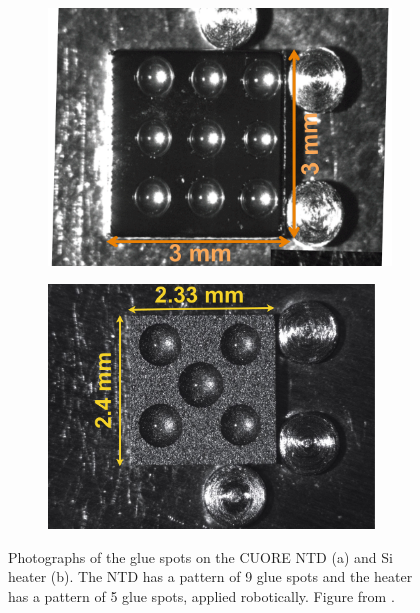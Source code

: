 \begin{figure}[htbp]
\centering
\begin{subfigure}[t]{0.45\textwidth}
\centering
    \includegraphics[width=0.95\linewidth]{Figures/fig10a.pdf}
\caption{}
\label{fig:glue_NTD}
\end{subfigure}
\qquad
\begin{subfigure}[t]{0.45\textwidth}
\centering
\includegraphics[width=0.95\textwidth]{Figures/fig10b.pdf}
\caption{}
\label{fig:glue_Si}
\end{subfigure}
\caption[Photographs of the glue spots on the CUORE NTD (a) and Si heater (b).]
{Photographs of the glue spots on the CUORE NTD (a) and Si heater (b).
The NTD has a pattern of 9 glue spots and the heater has a pattern of 5 glue spots, applied robotically.
Figure from \cite{Alduino:2016vjd}.}
\label{fig:glue}
\end{figure}

